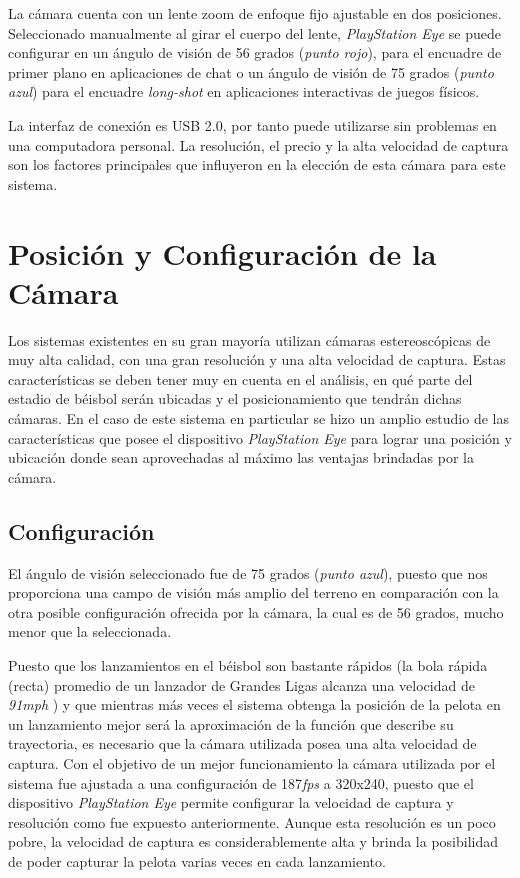 La cámara cuenta con un lente zoom de enfoque fijo ajustable en dos posiciones. Seleccionado manualmente al girar el cuerpo del lente, \textit{PlayStation Eye} se puede configurar en un ángulo de visión de 56 grados (\textit{punto rojo}), para el encuadre de primer plano en aplicaciones de chat o un ángulo de visión de 75 grados (\textit{punto azul}) para el encuadre \textit{long-shot} en aplicaciones interactivas de juegos físicos.

La interfaz de conexión es USB 2.0, por tanto puede utilizarse sin problemas en una computadora personal. La resolución, el precio y la alta velocidad de captura son los factores principales que influyeron en la elección de esta cámara para este sistema.

\section{Posición y Configuración de la Cámara}

Los sistemas existentes en su gran mayoría utilizan cámaras estereoscópicas de muy alta calidad, con una gran resolución y una alta velocidad de captura. Estas características se deben tener muy en cuenta en el análisis, en qué parte del estadio de béisbol serán ubicadas y el posicionamiento que tendrán dichas cámaras. En el caso de este sistema en particular se hizo un amplio estudio de las características que posee el dispositivo \textit{PlayStation Eye} para lograr una posición y ubicación donde sean aprovechadas al máximo las ventajas brindadas por la cámara.

\subsection{Configuración}

El ángulo de visión seleccionado fue de 75 grados (\textit{punto azul}), puesto que nos proporciona una campo de visión más amplio del terreno en comparación con la otra posible configuración ofrecida por la cámara, la cual es de 56 grados, mucho menor que la seleccionada.

Puesto que los lanzamientos en el béisbol son bastante rápidos (la bola rápida (recta) promedio de un lanzador de Grandes Ligas alcanza una velocidad de \textit{91mph} \cite{PitcherSpeed}) y que mientras más veces el sistema obtenga la posición de la pelota en un lanzamiento mejor será la aproximación de la función que describe su trayectoria, es necesario que la cámara utilizada posea una alta velocidad de captura. Con el objetivo de un mejor funcionamiento la cámara utilizada por el sistema fue ajustada a una configuración de 187\textit{fps} a 320x240, puesto que el dispositivo \textit{PlayStation Eye} permite configurar la velocidad de captura y resolución como fue expuesto anteriormente. Aunque esta resolución es un poco pobre, la velocidad de captura es considerablemente alta y brinda la posibilidad de poder capturar la pelota varias veces en cada lanzamiento.

